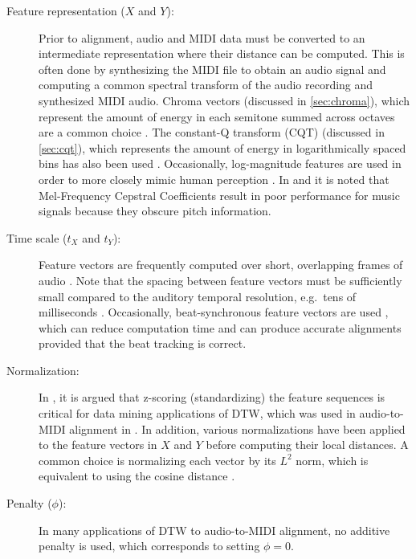 \begin{description}
\item[Feature representation ($X$ and $Y$):] Prior to alignment, audio and MIDI data must be converted to an intermediate representation where their distance can be computed.
This is often done by synthesizing the MIDI file to obtain an audio signal and computing a common spectral transform of the audio recording and synthesized MIDI audio.
Chroma vectors (discussed in \cref{sec:chroma}), which represent the amount of energy in each semitone summed across octaves \cite{fujishima1999realtime} are a common choice \cite{hu2003polyphonic, ewert2012towards}.
The constant-Q transform (CQT) (discussed in \cref{sec:cqt}), which represents the amount of energy in logarithmically spaced bins \cite{brown1991calculation} has also been used \cite{raffel2015large, dixon2005match, ellis2013aligning}.
Occasionally, log-magnitude features are used in order to more closely mimic human perception \cite{raffel2015large, ellis2013aligning, turetsky2003ground}.
In \cite{turetsky2003ground} and \cite{hu2003polyphonic} it is noted that Mel-Frequency Cepstral Coefficients result in poor performance for music signals because they obscure pitch information.
\item[Time scale ($t_X$ and $t_Y$):] Feature vectors are frequently computed over short, overlapping frames of audio \cite{dixon2005match, turetsky2003ground, hu2003polyphonic}.
Note that the spacing between feature vectors must be sufficiently small compared to the auditory temporal resolution, e.g.\ tens of milliseconds \cite{blauert1997spatial}.
Occasionally, beat-synchronous feature vectors are used \cite{raffel2015large,ellis2013aligning}, which can reduce computation time and can produce accurate alignments provided that the beat tracking is correct.
\item[Normalization:] In \cite{rakthanmanon2012searching}, it is argued that z-scoring (standardizing) the feature sequences is critical for data mining applications of DTW, which was used in audio-to-MIDI alignment in \cite{hu2003polyphonic}.
In addition, various normalizations have been applied to the feature vectors in $X$ and $Y$ before computing their local distances.
A common choice is normalizing each vector by its $L^2$ norm, which is equivalent to using the cosine distance \cite{turetsky2003ground, ewert2012towards, raffel2015large, ellis2013aligning}.
\item[Penalty ($\phi$):] In many applications of DTW to audio-to-MIDI alignment, no additive penalty is used, which corresponds to setting $\phi = 0$.

\end{description}
